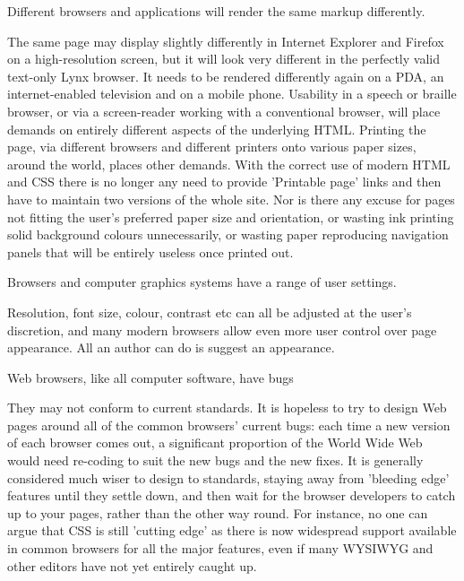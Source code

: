 \begin{compactitem}
\item Different browsers and applications will render the same markup differently.

The same page may display slightly differently in Internet Explorer and Firefox on a high-resolution screen, but it will look very different in the perfectly valid text-only Lynx browser. It needs to be rendered differently again on a PDA, an internet-enabled television and on a mobile phone. Usability in a speech or braille browser, or via a screen-reader working with a conventional browser, will place demands on entirely different aspects of the underlying HTML. Printing the page, via different browsers and different printers onto various paper sizes, around the world, places other demands. With the correct use of modern HTML and CSS there is no longer any need to provide 'Printable page' links and then have to maintain two versions of the whole site. Nor is there any excuse for pages not fitting the user's preferred paper size and orientation, or wasting ink printing solid background colours unnecessarily, or wasting paper reproducing navigation panels that will be entirely useless once printed out.

\item Browsers and computer graphics systems have a range of user settings.

Resolution, font size, colour, contrast etc can all be adjusted at the user's discretion, and many modern browsers allow even more user control over page appearance. All an author can do is suggest an appearance.

\item Web browsers, like all computer software, have bugs

They may not conform to current standards. It is hopeless to try to design Web pages around all of the common browsers' current bugs: each time a new version of each browser comes out, a significant proportion of the World Wide Web would need re-coding to suit the new bugs and the new fixes. It is generally considered much wiser to design to standards, staying away from 'bleeding edge' features until they settle down, and then wait for the browser developers to catch up to your pages, rather than the other way round. For instance, no one can argue that CSS is still 'cutting edge' as there is now widespread support available in common browsers for all the major features, even if many WYSIWYG and other editors have not yet entirely caught up.


\end{compactitem}

